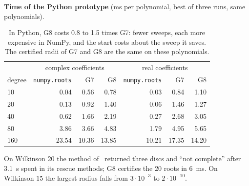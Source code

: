 \documentclass[10pt,a4paper]{article}
\theoremstyle{definition}
\numberwithin{equation}{section}
\begin{document}
\textbf{Time of the Python prototype} (ms per polynomial, best of three runs, same polynomials).
\begin{table}[H]\centering\small
\begin{tabular}{lrrr@{\qquad}rrr}
\toprule
 & \multicolumn{3}{c}{complex coefficients} & \multicolumn{3}{c}{real coefficients}\\
degree & \texttt{numpy.roots} & G7 & G8 & \texttt{numpy.roots} & G7 & G8\\
\midrule
10 & 0.04 & 0.56 & 0.78 & 0.03 & 0.84 & 1.10\\
20 & 0.13 & 0.92 & 1.40 & 0.06 & 1.46 & 1.27\\
40 & 0.62 & 1.66 & 2.19 & 0.27 & 2.68 & 3.05\\
80 & 3.86 & 3.66 & 4.83 & 1.79 & 4.95 & 5.65\\
160 & 23.54 & 10.36 & 13.85 & 10.21 & 17.35 & 14.20\\
\bottomrule
\end{tabular}
\caption{In Python, G8 costs 0.8 to 1.5 times G7: fewer sweeps, each more expensive in NumPy, and the
start costs about the sweep it saves. The certified radii of G7 and G8 are the same on these
polynomials.}
\end{table}
On Wilkinson 20 the method of~\cite{g7} returned three discs and ``not complete'' after 3.1~s spent in
its rescue methods; G8 certifies the 20 roots in 6~ms. On Wilkinson 15 the largest radius falls from
$3\cdot10^{-3}$ to $2\cdot10^{-10}$.
\end{document}
